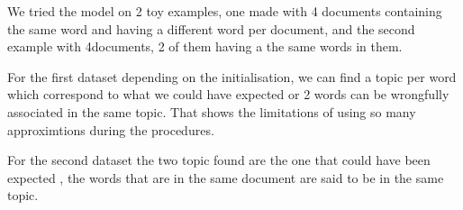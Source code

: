 We tried the model on 2 toy examples, one made with 4 documents containing the same word and having a different word per document, and the second example with 4documents, 2 of them having a the same words in them.

For the first dataset depending on the initialisation, we can find a topic per word which correspond to what we could have expected or 2 words can be wrongfully associated in the same topic. That shows the limitations of using so many approximtions during the procedures.

For the second dataset the two topic found are the one that could have been expected , the words that are in the same document are said to be in the same topic.
